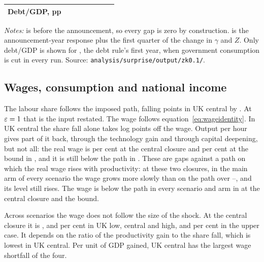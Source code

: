 \begin{table}[htbp]
\begin{tabular}{lrrrrrrr}
Debt/GDP, pp     & \genPathUkCentralDebtPpTwentySeven{} & \genPathUkCentralDebtPpTwentyEight{} & \genPathUkCentralDebtPpTwentyNine{} & \genPathUkCentralDebtPpThirty{} & \genPathUkCentralDebtPpThirtyOne{} & \genPathUkCentralDebtPpThirtyFive{} & \genPathUkCentralDebtPpThirtySix{} \\
\bottomrule
\end{tabular}
\par\medskip
\begin{minipage}{0.95\textwidth}
\footnotesize \emph{Notes:} \genRampZeroYear{} is before the announcement, so every gap is zero by construction. \genShockYear{} is the announcement-year response plus the first quarter of the change in $\gamma$ and $Z$. Only debt/GDP is shown for \genDebtRuleYear{}, the debt rule's first year, when government consumption is cut in every run. Source: \texttt{analysis/surprise/output/zk0.1/}.
\end{minipage}
\end{table}

\subsection{Wages, consumption and national income}
\label{sec:results-wages}

The labour share follows the imposed path, falling \genUkCentralFallPp{} points in UK central by \genHeadYear{}. At $\varepsilon = 1{}$ that is the input restated. The wage follows equation~\eqref{eq:wageidentity}. In UK central the share fall alone takes \genUkCentralShareLogPct{} log points off the wage. Output per hour gives part of it back, through the technology gain and through capital deepening, but not all: the real wage is \genUkCentralMainWageCentral{} per cent at the central closure and \genUkCentralMainWageBound{} per cent at the bound in \genHeadYear{}, and it is still below the path in \genLastFlowYear{}. These are gaps against a path on which the real wage rises with productivity: at these two closures, in the main arm of every scenario the wage grows more slowly than on the path over \genRampZeroYear--\genHeadYear{}, and its level still rises. The wage is below the path in every scenario and arm in \genHeadYear{} at the central closure and the bound.

Across scenarios the wage does not follow the size of the shock. At the central closure it is \genUkLowMainWageCentral{}, \genUkCentralMainWageCentral{} and \genUkHighMainWageCentral{} per cent in UK low, central and high, and \genKorinekMainWageCentral{} per cent in the upper case. It depends on the ratio of the productivity gain to the share fall, which is lowest in UK central. Per unit of GDP gained, UK central has the largest wage shortfall of the four.

